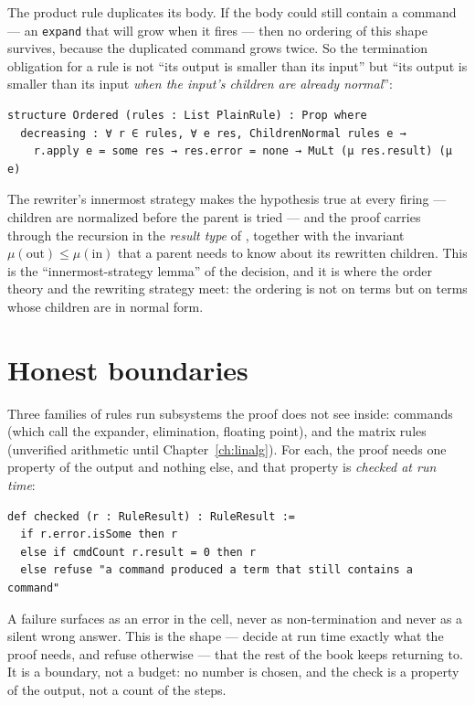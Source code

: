 The product rule duplicates its body. If the body could still contain a command --- an
\texttt{expand} that will grow when it fires --- then no ordering of this shape survives, because
the duplicated command grows twice. So the termination obligation for a rule is not ``its output
is smaller than its input'' but ``its output is smaller than its input \emph{when the input's
children are already normal}'':

\begin{verbatim}
structure Ordered (rules : List PlainRule) : Prop where
  decreasing : ∀ r ∈ rules, ∀ e res, ChildrenNormal rules e →
    r.apply e = some res → res.error = none → MuLt (μ res.result) (μ e)
\end{verbatim}

The rewriter's innermost strategy makes the hypothesis true at every firing --- children are
normalized before the parent is tried --- and the proof carries  through the recursion
in the \emph{result type} of , together with the invariant $\mu(\text{out}) \le
\mu(\text{in})$ that a parent needs to know about its rewritten children. This is the
``innermost-strategy lemma'' of the decision, and it is where the order theory and the rewriting
strategy meet: the ordering is not on terms but on terms whose children are in normal form.

\section{Honest boundaries}

Three families of rules run subsystems the proof does not see inside: commands (which call the
expander, elimination, floating point), and the matrix rules (unverified arithmetic until
Chapter~\ref{ch:linalg}). For each, the proof needs one property of the output and nothing else,
and that property is \emph{checked at run time}:

\begin{verbatim}
def checked (r : RuleResult) : RuleResult :=
  if r.error.isSome then r
  else if cmdCount r.result = 0 then r
  else refuse "a command produced a term that still contains a command"
\end{verbatim}

A failure surfaces as an error in the cell, never as non-termination and never as a silent wrong
answer. This is the shape --- decide at run time exactly what the proof needs, and refuse
otherwise --- that the rest of the book keeps returning to. It is a boundary, not a budget: no
number is chosen, and the check is a property of the output, not a count of the steps.

